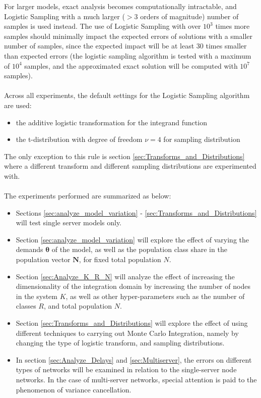 For larger models, exact analysis becomes computationally intractable, and Logistic Sampling with a much larger (\(>3\) orders of magnitude) number of samples is used instead. The use of Logistic Sampling with over \(10^3\) times more samples should minimally impact the expected errors of solutions with a smaller number of samples, since the expected impact will be at least 30 times smaller than expected errors (the logistic sampling algorithm is tested with a maximum of \(10^4\) samples, and the approximated exact solution will be computed with \(10^7\) samples).
\\\\
Across all experiments, the default settings for the Logistic Sampling algorithm are used:
\begin{itemize}
    \item the additive logistic transformation for the integrand function
    \item the t-distribution with degree of freedom \(\nu=4\) for sampling distribution
\end{itemize}

The only exception to this rule is section \ref{sec:Transforms_and_Distributions} where a different transform and different sampling distributions are experimented with. 
\\\\
The experiments performed are summarized as below:
\begin{itemize}
    \item Sections \ref{sec:analyze_model_variation} - \ref{sec:Transforms_and_Distributions} will test single server models only. 
    \item Section \ref{sec:analyze_model_variation} will explore the effect of varying the demands \(\boldsymbol{\theta}\) of the model, as well as the population class share in the population vector \(\mathbf{N}\), for fixed total population \(N\).
    \item Section \ref{sec:Analyze_K_R_N} will analyze the effect of increasing the dimensionality of the integration domain by increasing the number of nodes in the system \(K\), as well as other hyper-parameters such as the number of classes \(R\), and total population \(N\).
    \item Section \ref{sec:Transforms_and_Distributions} will explore the effect of using different techniques to carrying out Monte Carlo Integration, namely by changing the type of logistic transform, and sampling distributions. 
    \item In section \ref{sec:Analyze_Delays} and \ref{sec:Multiserver}, the errors on different types of networks will be examined in relation to the single-server node networks. In the case of multi-server networks, special attention is paid to the phenomenon of variance cancellation.
\end{itemize}

